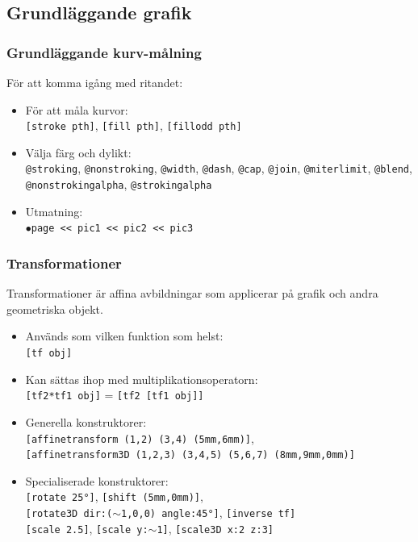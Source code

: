 \documentclass[noamsthm,handout]{beamer}
\begin{document}
\subsection{Grundläggande grafik}
\begin{frame}\frametitle{Grundläggande kurv-målning}
  För att komma igång med ritandet:
  \begin{itemize}
  \item För att måla kurvor:\\
    \texttt{[{\color{red}stroke} pth]}, \texttt{[{\color{red}fill} pth]}, \texttt{[{\color{red}fillodd} pth]}
  \item Välja färg och dylikt:\\
    \texttt{@stroking}, \texttt{@nonstroking}, \texttt{@width}, \texttt{@dash}, \texttt{@cap}, \texttt{@join}, \texttt{@miterlimit}, \texttt{@blend}, \texttt{@nonstrokingalpha}, \texttt{@strokingalpha}
  \item Utmatning:\\
    \texttt{$\bullet$page <{}< pic1 <{}< pic2 <{}< pic3}
  \end{itemize}
\end{frame}
\begin{frame}\frametitle{Transformationer}
  Transformationer är affina avbildningar som applicerar på grafik och andra geometriska objekt.
  \begin{itemize}
  \item Används som vilken funktion som helst:\\
    \texttt{[tf obj]}
  \item Kan sättas ihop med multiplikationsoperatorn:\\
    \texttt{[tf2*tf1 obj]} = \texttt{[tf2 [tf1 obj]]}
  \item Generella konstruktorer:\\
    \texttt{[affinetransform (1,2) (3,4) (5mm,6mm)]}, \\
    \texttt{[affinetransform3D (1,2,3) (3,4,5) (5,6,7) (8mm,9mm,0mm)]}
  \item Specialiserade konstruktorer:\\
    \texttt{[rotate 25°]}, \texttt{[shift (5mm,0mm)]}, \\
    \texttt{[rotate3D dir:($\sim$1,0,0) angle:45°]}, \texttt{[inverse tf]}\\
    \texttt{[scale 2.5]}, \texttt{[scale y:$\sim$1]}, \texttt{[scale3D x:2 z:3]}
  \end{itemize}
\end{frame}
\end{document}
